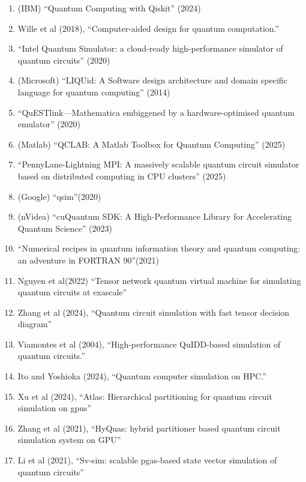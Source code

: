\documentclass[]{article}
\begin{document}
\begin{enumerate}
\item (IBM) ``Quantum Computing with Qiskit'' (2024)\cite{javadi2024quantum}
\item Wille et al (2018)\cite{wille2018computer}, ``Computer-aided design for quantum computation.''
\item ``Intel Quantum Simulator: a cloud-ready high-performance
 simulator of quantum circuits'' (2020)\cite{Guerreschi_Intel_Quantum_Simulator_2020}
\item (Microsoft) ``LIQUid: A Software design architecture 
 and domain specific language
 for quantum computing'' (2014)\cite{1402.4467}
\item ``QuESTlink—Mathematica embiggened by a hardware-optimised quantum emulator'' (2020)\cite{Jones_2020}
\item (Matlab) ``QCLAB: A Matlab Toolbox for Quantum Computing'' 
 (2025)\cite{keip2025qclabmatlabtoolboxquantum}
\item ``PennyLane-Lightning MPI: A massively scalable quantum circuit simulator based on distributed computing in CPU clusters'' (2025)\cite{kang2025pennylane}
\item (Google) ``qsim''(2020)\cite{quantum_ai_team_and_collaborators_2020_4023103}
\item (nVidea) ``cuQuantum SDK: A High-Performance Library for Accelerating Quantum Science'' (2023)\cite{10313722}
\item ``Numerical recipes in quantum information theory and quantum computing: an adventure in FORTRAN 90''(2021)\cite{ramkarthik2021numerical}
\item Nguyen et al(2022)\cite{nguyen2022tensor}
``Tensor network quantum virtual machine for simulating quantum circuits at exascale''
\item Zhang et al (2024)\cite{zhang2024quantum}, ``Quantum circuit simulation with fast tensor decision diagram''
\item Viamontes et al (2004)\cite{viamontes2004high}, ``High-performance QuIDD-based simulation of quantum circuits.''
\item Ito and Yoshioka (2024)\cite{Ito2024}, ``Quantum computer simulation on HPC.''
\item Xu et al (2024)\cite{xu2024atlas}, ``Atlas: Hierarchical partitioning for quantum circuit simulation on gpus''
\item Zhang et al (2021)\cite{zhang2021hyquas}, ``HyQuas: hybrid partitioner based quantum circuit simulation system on GPU''
\item Li et al (2021)\cite{li2021sv}, ``Sv-sim: scalable pgas-based state vector simulation of quantum circuits''

\end{enumerate}
\end{document}
